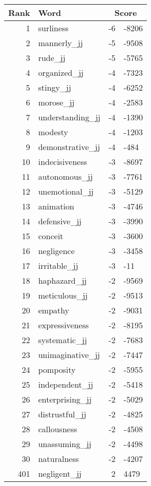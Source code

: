 \begin{longtable}[!htbp]{| rlr@{.}l |}
    \hline
    \textbf{Rank} & \textbf{Word} & \multicolumn{2}{c|}{\textbf{Score}} \\
    \hline
    \endhead
    1 & surliness & -6 & -8206 \\
    2 & mannerly\_jj & -5 & -9508 \\
    3 & rude\_jj & -5 & -5765 \\
    4 & organized\_jj & -4 & -7323 \\
    5 & stingy\_jj & -4 & -6252 \\
    6 & morose\_jj & -4 & -2583 \\
    7 & understanding\_jj & -4 & -1390 \\
    8 & modesty & -4 & -1203 \\
    9 & demonstrative\_jj & -4 & -484 \\
    10 & indecisiveness & -3 & -8697 \\
    11 & autonomous\_jj & -3 & -7761 \\
    12 & unemotional\_jj & -3 & -5129 \\
    13 & animation & -3 & -4746 \\
    14 & defensive\_jj & -3 & -3990 \\
    15 & conceit & -3 & -3600 \\
    16 & negligence & -3 & -3458 \\
    17 & irritable\_jj & -3 & -11 \\
    18 & haphazard\_jj & -2 & -9569 \\
    19 & meticulous\_jj & -2 & -9513 \\
    20 & empathy & -2 & -9031 \\
    21 & expressiveness & -2 & -8195 \\
    22 & systematic\_jj & -2 & -7683 \\
    23 & unimaginative\_jj & -2 & -7447 \\
    24 & pomposity & -2 & -5955 \\
    25 & independent\_jj & -2 & -5418 \\
    26 & enterprising\_jj & -2 & -5029 \\
    27 & distrustful\_jj & -2 & -4825 \\
    28 & callousness & -2 & -4508 \\
    29 & unassuming\_jj & -2 & -4498 \\
    30 & naturalness & -2 & -4207 \\
    401 & negligent\_jj & 2 & 4479 \\

\end{longtable}
